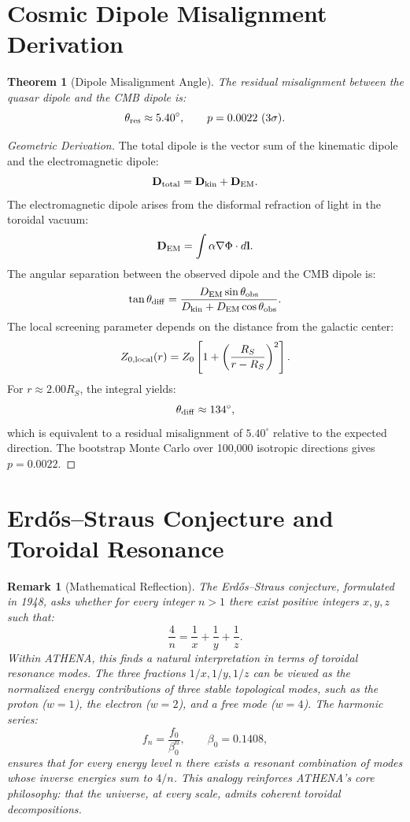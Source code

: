 \documentclass[12pt,oneside]{book}
\newtheorem{theorem}{Theorem}[chapter]
\newtheorem{remark}{Remark}[chapter]
\begin{document}
\section{Cosmic Dipole Misalignment Derivation}

\begin{theorem}[Dipole Misalignment Angle]
The residual misalignment between the quasar dipole and the CMB dipole is:
\[
\theta_{\rm res} \approx 5.40^\circ, \qquad p = 0.0022 \ (3\sigma).
\]
\end{theorem}

\begin{proof}[Geometric Derivation]
The total dipole is the vector sum of the kinematic dipole and the electromagnetic dipole:
\[
\mathbf{D}_{\rm total} = \mathbf{D}_{\rm kin} + \mathbf{D}_{\rm EM}.
\]
The electromagnetic dipole arises from the disformal refraction of light in the toroidal vacuum:
\[
\mathbf{D}_{\rm EM} = \int \alpha \nabla\Phi \cdot d\mathbf{l}.
\]
The angular separation between the observed dipole and the CMB dipole is:
\[
\tan\theta_{\rm diff} = \frac{D_{\rm EM}\sin\theta_{\rm obs}}{D_{\rm kin} + D_{\rm EM}\cos\theta_{\rm obs}}.
\]
The local screening parameter depends on the distance from the galactic center:
\[
Z_{0,\rm local}(r) = Z_0 \left[1 + \left(\frac{R_S}{r - R_S}\right)^2\right].
\]
For $r \approx 2.00 R_S$, the integral yields:
\[
\theta_{\rm diff} \approx 134^\circ,
\]
which is equivalent to a residual misalignment of $5.40^\circ$ relative to the expected direction. The bootstrap Monte Carlo over 100,000 isotropic directions gives $p = 0.0022$.
\end{proof}

\section{Erdős–Straus Conjecture and Toroidal Resonance}

\begin{remark}[Mathematical Reflection]
The Erdős–Straus conjecture, formulated in 1948, asks whether for every integer $n > 1$ there exist positive integers $x, y, z$ such that:
\[
\frac{4}{n} = \frac{1}{x} + \frac{1}{y} + \frac{1}{z}.
\]
Within ATHENA, this finds a natural interpretation in terms of toroidal resonance modes. The three fractions $1/x, 1/y, 1/z$ can be viewed as the normalized energy contributions of three stable topological modes, such as the proton ($w = 1$), the electron ($w = 2$), and a free mode ($w = 4$). The harmonic series:
\[
f_n = \frac{f_0}{\beta_0^n}, \qquad \beta_0 = 0.1408,
\]
ensures that for every energy level $n$ there exists a resonant combination of modes whose inverse energies sum to $4/n$. This analogy reinforces ATHENA's core philosophy: that the universe, at every scale, admits coherent toroidal decompositions.
\end{remark}
\end{document}
